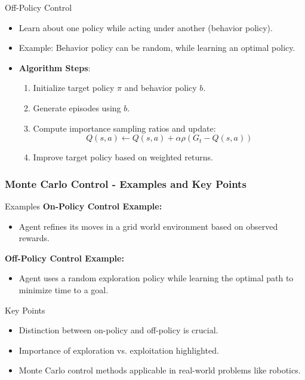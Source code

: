 \documentclass[aspectratio=169]{beamer}
\begin{document}
\begin{frame}[fragile]
    \begin{block}{Off-Policy Control}
        \begin{itemize}
            \item Learn about one policy while acting under another (behavior policy).
            \item Example: Behavior policy can be random, while learning an optimal policy.
            \item \textbf{Algorithm Steps}:
                \begin{enumerate}
                    \item Initialize target policy \(\pi\) and behavior policy \(b\).
                    \item Generate episodes using \(b\).
                    \item Compute importance sampling ratios and update:
                        \[
                        Q(s, a) \leftarrow Q(s, a) + \alpha \rho (G_t - Q(s, a))
                        \]
                    \item Improve target policy based on weighted returns.
                \end{enumerate}
        \end{itemize}
    \end{block}
\end{frame}

\begin{frame}[fragile]
    \frametitle{Monte Carlo Control - Examples and Key Points}
    \begin{block}{Examples}
        \textbf{On-Policy Control Example:}
        \begin{itemize}
            \item Agent refines its moves in a grid world environment based on observed rewards.
        \end{itemize}

        \textbf{Off-Policy Control Example:}
        \begin{itemize}
            \item Agent uses a random exploration policy while learning the optimal path to minimize time to a goal.
        \end{itemize}
    \end{block}

    \begin{block}{Key Points}
        \begin{itemize}
            \item Distinction between on-policy and off-policy is crucial.
            \item Importance of exploration vs. exploitation highlighted.
            \item Monte Carlo control methods applicable in real-world problems like robotics.
        \end{itemize}
    \end{block}
\end{frame}
\end{document}
